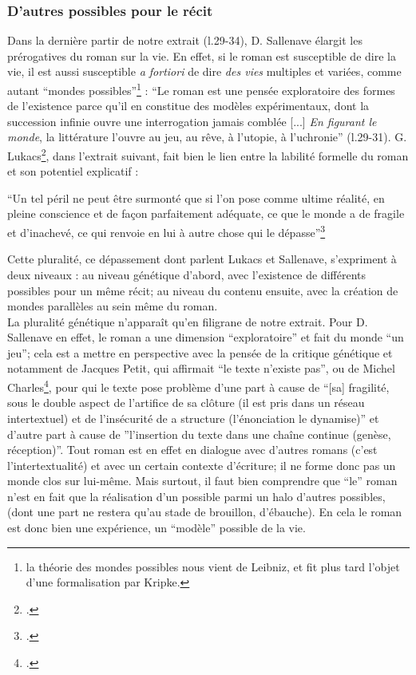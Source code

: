 \documentclass[a4paper,10pt]{article}
\begin{document}
			\subsubsection{D'autres possibles pour le récit}
				Dans la dernière partir de notre extrait (l.29-34), D. Sallenave élargit les prérogatives du roman sur la vie. En effet, si le roman est susceptible de dire la vie, il est aussi susceptible \textit{a fortiori} de dire \textit{des vies} multiples et variées, comme autant ``mondes possibles''\footnote{la théorie des mondes possibles nous vient de Leibniz, et fit plus tard l'objet d'une formalisation par Kripke.} : ``Le roman est une pensée exploratoire des formes de l'existence parce qu'il en constitue des modèles expérimentaux, dont la succession infinie ouvre une interrogation jamais comblée [...] \textit{En figurant le monde}, la littérature l'ouvre au jeu, au rêve, à l'utopie, à l'uchronie'' (l.29-31). G. Lukacs\footcite{Lukacs1916}, dans l'extrait suivant, fait bien le lien entre la labilité formelle du roman et son potentiel explicatif :
			\begin{center}
				\footnotesize
				\begin{minipage}{0.7\textwidth}
					``Un tel péril ne peut être surmonté que si l'on pose comme ultime réalité, en pleine conscience et de façon parfaitement adéquate, ce que le monde a de fragile et d'inachevé, ce qui renvoie en lui à autre chose qui le dépasse''\footcite[p.~54]{Lukacs1916}
				\end{minipage}
			\end{center}
			Cette pluralité, ce dépassement dont parlent Lukacs et Sallenave, s'expriment à deux niveaux : au niveau génétique d'abord, avec l'existence de différents possibles pour un même récit; au niveau du contenu ensuite, avec la création de mondes parallèles au sein même du roman.\\
			La pluralité génétique n'apparaît qu'en filigrane de notre extrait. Pour D. Sallenave en effet, le roman a une dimension ``exploratoire'' et fait du monde ``un jeu''; cela est a mettre en perspective avec la pensée de la critique génétique et notamment de Jacques Petit, qui affirmait ``le texte n'existe pas'', ou de Michel Charles\footcite[p.~64]{Charles1985}, pour qui le texte pose problème d'une part à cause de ``[sa] fragilité, sous le double aspect de l'artifice de sa clôture (il est pris dans un réseau intertextuel) et de l'insécurité de a structure (l'énonciation le dynamise)'' et d'autre part à cause de ''l'insertion du texte dans une chaîne continue (genèse, réception)''. Tout roman est en effet en dialogue avec d'autres romans (c'est l'intertextualité) et avec un certain contexte d'écriture; il ne forme donc pas un monde clos sur lui-même. Mais surtout, il faut bien comprendre que ``le'' roman n'est en fait que la réalisation d'un possible parmi un halo d'autres possibles, (dont une part ne restera qu'au stade de brouillon, d'ébauche). En cela le roman est donc bien une expérience, un ``modèle'' possible de la vie.\\
\end{document}

